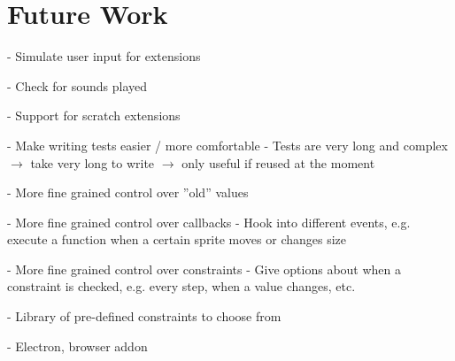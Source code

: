 
\chapter{Future Work}

- Simulate user input for extensions

- Check for sounds played

- Support for scratch extensions

- Make writing tests easier / more comfortable
    - Tests are very long and complex
    $\rightarrow$ take very long to write $\rightarrow$ only useful if reused at the moment

- More fine grained control over ''old'' values

- More fine grained control over callbacks
    - Hook into different events, e.g. execute a function when a certain sprite moves or changes size

- More fine grained control over constraints
    - Give options about when a constraint is checked, e.g. every step, when a value changes, etc.

- Library of pre-defined constraints to choose from

- Electron, browser addon
